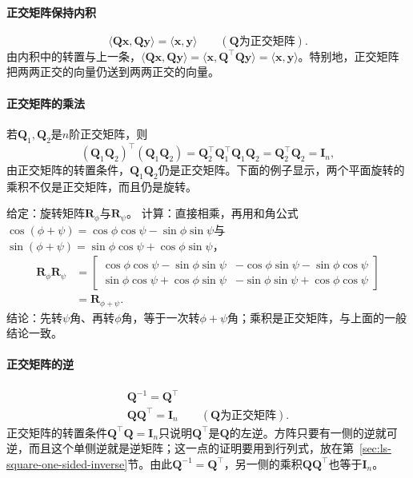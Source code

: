 \paragraph{正交矩阵保持内积}
\[
 \langle\bm Q\bm x,\bm Q\bm y\rangle=\langle\bm x,\bm y\rangle\qquad(\bm Q\text{为正交矩阵}).
\]
由内积中的转置与上一条，$\langle\bm Q\bm x,\bm Q\bm y\rangle=\langle\bm x,\bm Q^\top\bm Q\bm y\rangle=\langle\bm x,\bm y\rangle$。特别地，正交矩阵把两两正交的向量仍送到两两正交的向量。



\paragraph{正交矩阵的乘法}
若$\bm Q_1,\bm Q_2$是$n$阶正交矩阵，则
\[
 (\bm Q_1\bm Q_2)^\top(\bm Q_1\bm Q_2)=\bm Q_2^\top\bm Q_1^\top\bm Q_1\bm Q_2=\bm Q_2^\top\bm Q_2=\bm I_n,
\]
由正交矩阵的转置条件，$\bm Q_1\bm Q_2$仍是正交矩阵。下面的例子显示，两个平面旋转的乘积不仅是正交矩阵，而且仍是旋转。
\begin{example}[两个平面旋转的乘积]
\label{ex:ls-rotation-composition}
给定：旋转矩阵$\bm R_\phi$与$\bm R_\psi$。
计算：直接相乘，再用和角公式$\cos(\phi+\psi)=\cos\phi\cos\psi-\sin\phi\sin\psi$与$\sin(\phi+\psi)=\sin\phi\cos\psi+\cos\phi\sin\psi$，
\[
 \begin{aligned}
 \bm R_\phi\bm R_\psi
 &=\begin{bmatrix}\cos\phi\cos\psi-\sin\phi\sin\psi&-\cos\phi\sin\psi-\sin\phi\cos\psi\\\sin\phi\cos\psi+\cos\phi\sin\psi&-\sin\phi\sin\psi+\cos\phi\cos\psi\end{bmatrix}\\
 &=\bm R_{\phi+\psi}.
 \end{aligned}
\]
结论：先转$\psi$角、再转$\phi$角，等于一次转$\phi+\psi$角；乘积是正交矩阵，与上面的一般结论一致。
\end{example}


\paragraph{正交矩阵的逆}
\[
\begin{gathered}
\bm Q^{-1}=\bm Q^\top\\
\bm Q\bm Q^\top=\bm I_n\qquad(\bm Q\text{为正交矩阵}).
\end{gathered}
\]
正交矩阵的转置条件$\bm Q^\top\bm Q=\bm I_n$只说明$\bm Q^\top$是$\bm Q$的左逆。方阵只要有一侧的逆就可逆，而且这个单侧逆就是逆矩阵；这一点的证明要用到行列式，放在第~\ref{sec:ls-square-one-sided-inverse}节。由此$\bm Q^{-1}=\bm Q^\top$，另一侧的乘积$\bm Q\bm Q^\top$也等于$\bm I_n$。

